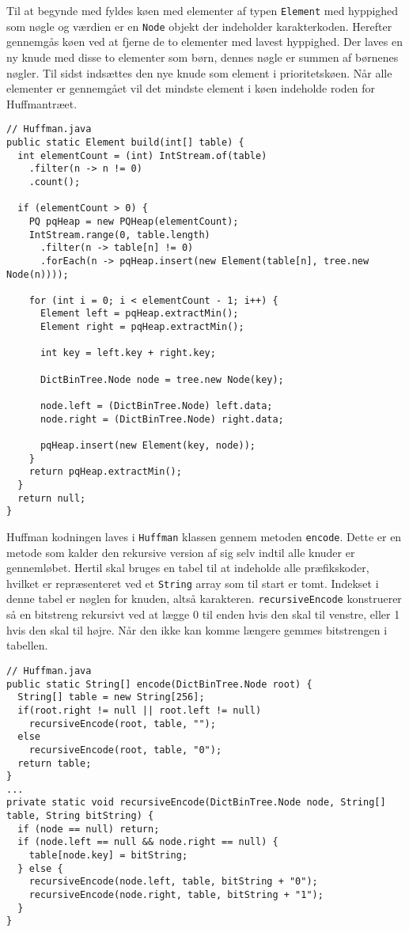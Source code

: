 \documentclass{article}
\begin{document}
Til at begynde med fyldes køen med elementer af typen \texttt{Element} med hyppighed som nøgle og værdien er en \texttt{Node} objekt der indeholder karakterkoden. Herefter gennemgås køen ved at fjerne de to elementer med lavest hyppighed. Der laves en ny knude med disse to elementer som børn, dennes nøgle er summen af børnenes nøgler. Til sidst indsættes den nye knude som element i prioritetskøen. Når alle elementer er gennemgået vil det mindste element i køen indeholde roden for Huffmantræet.
\begin{lstlisting}
// Huffman.java
public static Element build(int[] table) {
  int elementCount = (int) IntStream.of(table)
    .filter(n -> n != 0)
    .count();
		
  if (elementCount > 0) {
    PQ pqHeap = new PQHeap(elementCount);
    IntStream.range(0, table.length)
      .filter(n -> table[n] != 0)
      .forEach(n -> pqHeap.insert(new Element(table[n], tree.new Node(n))));

    for (int i = 0; i < elementCount - 1; i++) {
      Element left = pqHeap.extractMin();
      Element right = pqHeap.extractMin();
	
      int key = left.key + right.key;

      DictBinTree.Node node = tree.new Node(key);
			
      node.left = (DictBinTree.Node) left.data;
      node.right = (DictBinTree.Node) right.data;
            
      pqHeap.insert(new Element(key, node));
    }
    return pqHeap.extractMin();
  }
  return null;
}
\end{lstlisting}
Huffman kodningen laves i \texttt{Huffman} klassen gennem metoden \texttt{encode}. Dette er en metode som kalder den rekursive version af sig selv indtil alle knuder er gennemløbet. Hertil skal bruges en tabel til at indeholde alle præfikskoder, hvilket er repræsenteret ved et \texttt{String} array som til start er tomt. Indekset i denne tabel er nøglen for knuden, altså karakteren. \texttt{recursiveEncode} konstruerer så en bitstreng rekursivt ved at lægge 0 til enden hvis den skal til venstre, eller 1 hvis den skal til højre. Når den ikke kan komme længere gemmes bitstrengen i tabellen.

\begin{lstlisting}
// Huffman.java
public static String[] encode(DictBinTree.Node root) {
  String[] table = new String[256];
  if(root.right != null || root.left != null)
    recursiveEncode(root, table, "");
  else
    recursiveEncode(root, table, "0");
  return table;
}
...
private static void recursiveEncode(DictBinTree.Node node, String[] table, String bitString) {
  if (node == null) return;
  if (node.left == null && node.right == null) {
    table[node.key] = bitString;
  } else {
    recursiveEncode(node.left, table, bitString + "0");
    recursiveEncode(node.right, table, bitString + "1");
  }
}
\end{lstlisting}
\end{document}

